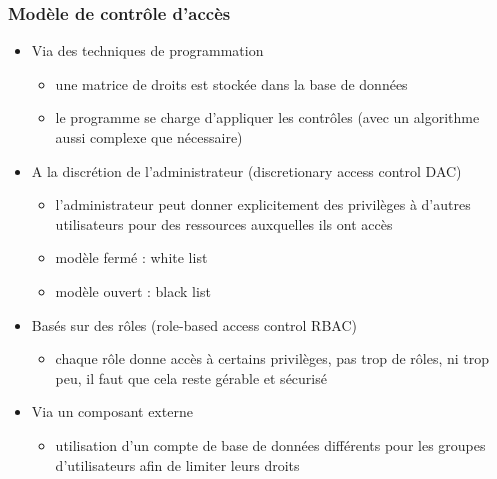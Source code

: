 \documentclass{beamer}
\begin{document}
\begin{frame}
  \frametitle{Modèle de contrôle d'accès}
  \begin{itemize}
    \item Via des techniques de programmation
    \begin{itemize}
      \item une matrice de droits est stockée dans la base de données 
      \item le programme se charge d'appliquer les contrôles (avec un algorithme aussi complexe que nécessaire)
    \end{itemize}
    \item A la discrétion de l'administrateur (discretionary access control DAC)
    \begin{itemize}
      \item l'administrateur peut donner explicitement des privilèges à d'autres utilisateurs pour des ressources auxquelles ils ont accès
      \item modèle fermé : white list
      \item modèle ouvert : black list
    \end{itemize}
    \item Basés sur des rôles (role-based access control RBAC)
    \begin{itemize}
      \item chaque rôle donne accès à certains privilèges, pas trop de rôles, ni trop peu, il faut que cela reste gérable et sécurisé
    \end{itemize}
    \item Via un composant externe
    \begin{itemize}
      \item utilisation d'un compte de base de données différents pour les groupes d'utilisateurs afin de limiter leurs droits
    \end{itemize}
  \end{itemize}
\end{frame}
\end{document}
